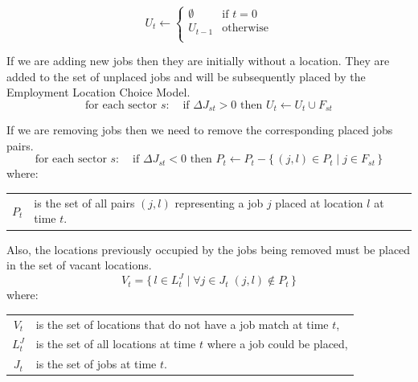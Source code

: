 \documentclass[fleqn]{article}
\newcommand{\JL}{L^J}
\begin{document}
\begin{equation}
U_t \leftarrow \begin{cases}
        \emptyset & \text{if $t=0$} \\
        U_{t-1}   & \text{otherwise}\\
    \end{cases}
\end{equation}

If we are adding new jobs then they are initially without a
location.  They are added to the set of unplaced jobs and will be
subsequently placed by the Employment Location Choice Model.
\begin{equation}
\text{for each sector $s$: } \;\;
     \text{ if } \Delta J_{st} > 0   \text{ then }
     U_t \leftarrow  U_t \cup F_{st}
\end{equation}

If we are removing jobs then we need to remove the corresponding placed jobs
pairs.
\begin{equation}
\text{for each sector $s$: } \;\;
     \text{ if } \Delta J_{st} < 0   \text{ then }
     P_t \leftarrow P_t - \{\, (j,l) \in P_t \mid j \in F_{st} \,\}
\end{equation}
where:
\begin{center}
\begin{tabular}{c p{5.5in}}
$P_t$ & is the set of all pairs $(j,l)$ representing a job $j$ placed at
location $l$ at time $t$.\\
\end{tabular}
\end{center}


Also, the locations previously occupied by the jobs being removed
must be placed in the set of vacant locations.
\begin{equation}
V_t = \{\, l \in \JL_{t} \mid \forall j \in J_{t} \; (j, l) \notin P_t \,\}
\end{equation}
where:
\begin{center}
\begin{tabular}{c p{5.5in}}
$V_t$ & is the set of locations that do not have a job match at
time $t$,\\
$\JL_{t}$ & is the set of all locations at time $t$ where a job
could be placed,\\
$J_{t}$ & is the set of jobs at time $t$.\\
\end{tabular}
\end{center}
\end{document}
